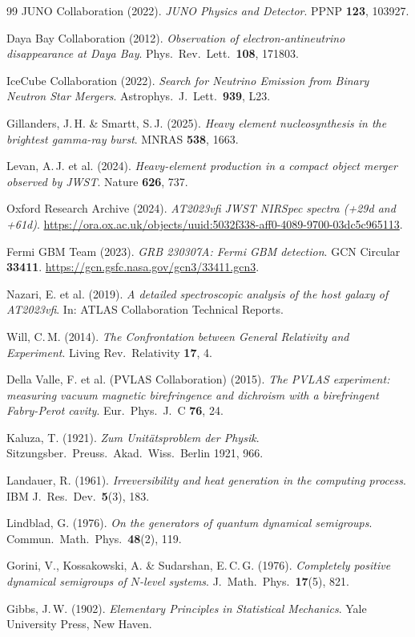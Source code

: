 \documentclass[12pt,a4paper,twoside]{article}
\begin{document}
\begin{thebibliography}{99}
JUNO Collaboration (2022).
\textit{JUNO Physics and Detector}.
PPNP \textbf{123}, 103927.

Daya Bay Collaboration (2012).
\textit{Observation of electron-antineutrino disappearance at Daya Bay}.
Phys.\ Rev.\ Lett.\ \textbf{108}, 171803.

IceCube Collaboration (2022).
\textit{Search for Neutrino Emission from Binary Neutron Star Mergers}.
Astrophys.\ J.\ Lett.\ \textbf{939}, L23.

Gillanders, J.\,H. \& Smartt, S.\,J. (2025).
\textit{Heavy element nucleosynthesis in the brightest gamma-ray burst}.
MNRAS \textbf{538}, 1663.

Levan, A.\,J. et al. (2024).
\textit{Heavy-element production in a compact object merger observed by JWST}.
Nature \textbf{626}, 737.

Oxford Research Archive (2024).
\textit{AT2023vfi JWST NIRSpec spectra (+29d and +61d)}.
\url{https://ora.ox.ac.uk/objects/uuid:5032f338-aff0-4089-9700-03dc5c965113}.

Fermi GBM Team (2023).
\textit{GRB 230307A: Fermi GBM detection}.
GCN Circular \textbf{33411}. \url{https://gcn.gsfc.nasa.gov/gcn3/33411.gcn3}.

Nazari, E. et al. (2019).
\textit{A detailed spectroscopic analysis of the host galaxy of AT2023vfi}.
In: ATLAS Collaboration Technical Reports.

Will, C.\,M. (2014).
\textit{The Confrontation between General Relativity and Experiment}.
Living Rev.\ Relativity \textbf{17}, 4.

Della Valle, F. et al. (PVLAS Collaboration) (2015).
\textit{The PVLAS experiment: measuring vacuum magnetic birefringence and dichroism with a birefringent Fabry-Perot cavity}.
Eur.\ Phys.\ J.\ C \textbf{76}, 24.

Kaluza, T. (1921).
\textit{Zum Unit\"atsproblem der Physik}.
Sitzungsber.\ Preuss.\ Akad.\ Wiss.\ Berlin 1921, 966.

Landauer, R. (1961).
\textit{Irreversibility and heat generation in the computing process}.
IBM J.\ Res.\ Dev.\ \textbf{5}(3), 183.

Lindblad, G. (1976).
\textit{On the generators of quantum dynamical semigroups}.
Commun.\ Math.\ Phys.\ \textbf{48}(2), 119.

Gorini, V., Kossakowski, A. \& Sudarshan, E.\,C.\,G. (1976).
\textit{Completely positive dynamical semigroups of $N$-level systems}.
J.\ Math.\ Phys.\ \textbf{17}(5), 821.

Gibbs, J.\,W. (1902).
\textit{Elementary Principles in Statistical Mechanics}.
Yale University Press, New Haven.

\end{thebibliography}
\end{document}
